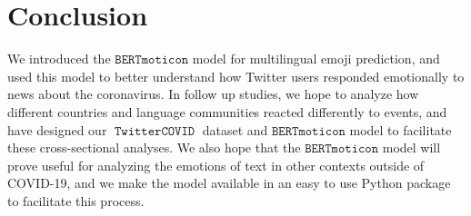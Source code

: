 \documentclass[11pt]{article}
\newcommand{\bertmoji}{\texttt{BERTmoticon}}
\DeclareMathOperator{\corona}{\texttt{TwitterCOVID}}
\begin{document}
\section{Conclusion}

We introduced the $\bertmoji$ model for multilingual emoji prediction,
and used this model to better understand how Twitter users responded emotionally to news about the coronavirus.
In follow up studies, we hope to analyze how different countries and language communities reacted differently to events,
and have designed our $\corona$ dataset and $\bertmoji$ model to facilitate these cross-sectional analyses.
We also hope that the $\bertmoji$ model will prove useful for analyzing the emotions of text in other contexts outside of COVID-19,
and we make the model available in an easy to use Python package to facilitate this process.



%


\end{document}
